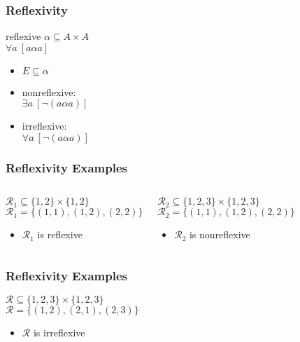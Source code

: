 \documentclass[dvipsnames]{beamer}
\begin{document}
\begin{frame}
  \frametitle{Reflexivity}

  \begin{block}{reflexive}
    $\alpha \subseteq A \times A$\\
    $\forall a~[a \alpha a]$
  \end{block}

  \pause
  \begin{itemize}
    \item $E \subseteq \alpha$

    \pause
    \medskip
    \item nonreflexive:\\
      $\exists a~[\neg (a \alpha a)]$

    \pause
    \item irreflexive:\\
      $\forall a~[\neg (a \alpha a)]$
  \end{itemize}
\end{frame}

\begin{frame}
  \frametitle{Reflexivity Examples}

  \begin{columns}[t]
    \begin{example}
      $\mathcal{R}_1 \subseteq \{1,2\} \times \{1,2\}$\\
      $\mathcal{R}_1 = \{(1,1), (1,2), (2,2)\}$

      \medskip
      \begin{itemize}
        \item $\mathcal{R}_1$ is reflexive
      \end{itemize}
    \end{example}

    \pause
    \begin{example}
      $\mathcal{R}_2 \subseteq \{1,2,3\} \times \{1,2,3\}$\\
      $\mathcal{R}_2 = \{(1,1), (1,2), (2,2)\}$

      \medskip
      \begin{itemize}
        \item $\mathcal{R}_2$ is nonreflexive
      \end{itemize}
    \end{example}
  \end{columns}
\end{frame}

\begin{frame}
  \frametitle{Reflexivity Examples}

  \begin{example}
    $\mathcal{R} \subseteq \{1,2,3\} \times \{1,2,3\}$\\
    $\mathcal{R} = \{(1,2), (2,1), (2,3)\}$

    \medskip
    \begin{itemize}
      \item $\mathcal{R}$ is irreflexive
    \end{itemize}
  \end{example}
\end{frame}
\end{document}
